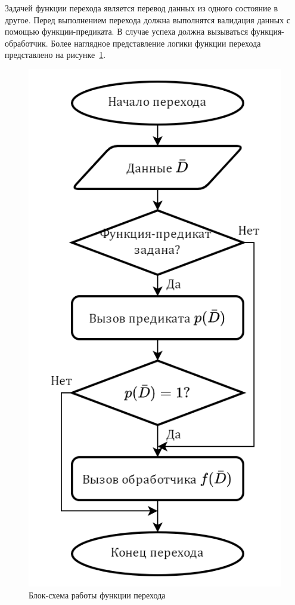 Задачей функции перехода является перевод данных из одного состояние в другое. Перед выполнением перехода должна выполнятся валидация данных с помощью функции-предиката. В случае успеха должна вызываться функция-обработчик. Более наглядное представление логики функции перехода представлено на рисунке~\ref{fig:flowchartTransfer}.

\begin{figure}[!ht]
    \centering
    \includegraphics[height=0.4\textheight]{figures/flowchart.transfer.png}
    \caption{Блок-схема работы функции перехода}
    \label{fig:flowchartTransfer}
\end{figure}

